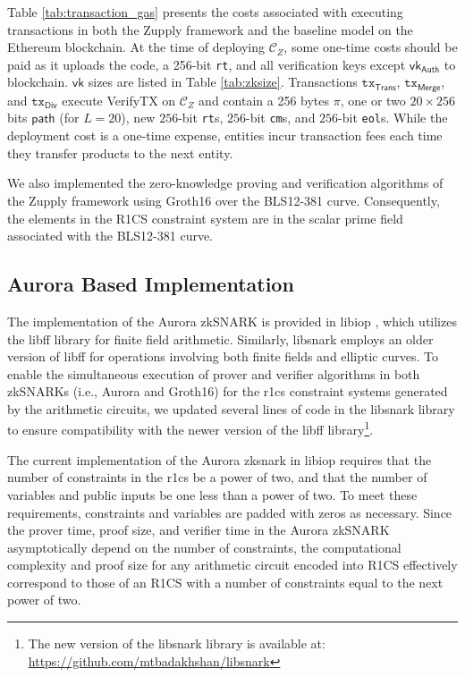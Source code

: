Table \ref{tab:transaction_gas} presents the costs associated with executing transactions in both the Zupply framework and the baseline model on the Ethereum blockchain. 
At the time of deploying $\mathcal{C}_Z$, some one-time costs should be paid as it uploads the code, a 256-bit \texttt{rt}, and all verification keys except $\mathsf{vk}_\mathsf{Auth}$ to blockchain. $\mathsf{vk}$ sizes are listed in Table \ref{tab:zksize}.  Transactions $\texttt{tx}_\mathsf{Trans}$, $\texttt{tx}_\mathsf{Merge}$, and $\texttt{tx}_\mathsf{Div}$ execute \textsf{VerifyTX} on  $\mathcal{C}_Z$ and contain a 256 bytes $\pi$, one or two $20 \times 256$ bits $\mathsf{path}$ (for $L=20$), new $256$-bit \texttt{rt}s,  $256$-bit \texttt{cm}s, and $256$-bit \texttt{eol}s. 
While the deployment cost is a one-time expense, entities incur transaction fees each time they transfer products to the next entity. 

We also implemented the zero-knowledge proving and verification algorithms of the Zupply framework using Groth16 over the BLS12-381 curve. Consequently, the elements in the R1CS constraint system are in the scalar prime field associated with the BLS12-381 curve.

\subsection{Aurora Based Implementation}
\label{sec:aurora-based-Implementation}
The implementation of the Aurora zkSNARK is provided in libiop \cite{libiop}, which utilizes the libff \cite{libff} library for finite field arithmetic. Similarly, libsnark employs an older version of libff for operations involving both finite fields and elliptic curves. To enable the simultaneous execution of prover and verifier algorithms in both zkSNARKs (i.e., Aurora and Groth16) for the \gls{r1cs} constraint systems generated by the arithmetic circuits, we updated several lines of code in the libsnark library to ensure compatibility with the newer version of the libff library\footnote{The new version of the libsnark library is available at: \url{https://github.com/mtbadakhshan/libsnark}}.

The current implementation of the Aurora \gls{zksnark} in libiop \cite{libiop} requires that the number of constraints in the \gls{r1cs} be a power of two, and that the number of variables and public inputs be one less than a power of two. To meet these requirements, constraints and variables are padded with zeros as necessary. Since the prover time, proof size, and verifier time in the Aurora zkSNARK asymptotically depend on the number of constraints, the computational complexity and proof size for any arithmetic circuit encoded into R1CS effectively correspond to those of an R1CS with a number of constraints equal to the next power of two. 


